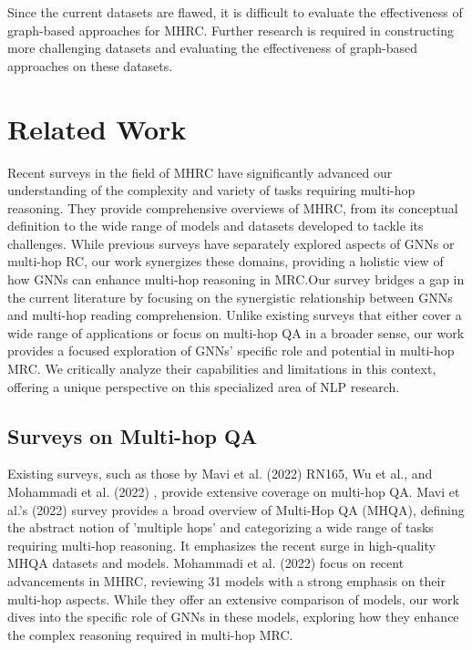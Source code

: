 \documentclass[sigplan,screen,nonacm]{acmart}
\begin{document}
Since the current datasets are flawed, it is difficult to evaluate the effectiveness of graph-based approaches for MHRC. Further research is 
required in constructing more challenging datasets and evaluating the effectiveness of graph-based approaches on these datasets.



\section{Related Work}
Recent surveys in the field of MHRC have significantly advanced our understanding of the complexity and variety of tasks requiring multi-hop reasoning. 
They provide comprehensive overviews of MHRC, from its conceptual definition to the wide range of models and datasets developed to tackle its challenges. 
While previous surveys have separately explored aspects of GNNs or multi-hop RC, our work synergizes these domains, providing a holistic view 
of how GNNs can enhance multi-hop reasoning in MRC.Our survey bridges a gap in the current literature by focusing on the synergistic relationship 
between GNNs and multi-hop reading comprehension. Unlike existing surveys that either cover a wide range of applications or focus on multi-hop QA 
in a broader sense, our work provides a focused exploration of GNNs' specific role and potential in multi-hop MRC. We critically analyze their
capabilities and limitations in this context, offering a unique perspective on this specialized area of NLP research. 

\subsection{Surveys on Multi-hop QA}
Existing surveys, such as those by Mavi et al. (2022) RN165, Wu et al., and Mohammadi et al. (2022) \cite{RN80}, provide extensive coverage on multi-hop QA. Mavi et al.'s (2022) \cite{RN165} survey provides a broad overview of Multi-Hop QA (MHQA), defining the abstract notion of 'multiple hops' and categorizing 
a wide range of tasks requiring multi-hop reasoning. It emphasizes the recent surge in high-quality MHQA datasets and models. 
Mohammadi et al. (2022) \cite{RN80} focus on recent advancements in MHRC, reviewing 31 models with a strong emphasis on their multi-hop aspects. 
While they offer an extensive comparison of models, our work dives into the specific role of GNNs in these models, exploring how they enhance 
the complex reasoning required in multi-hop MRC.
\end{document}
